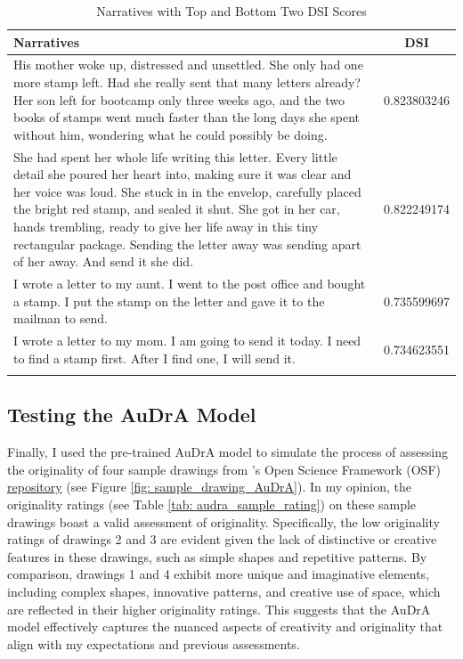 \documentclass[../Proposal_Writing_Sample.tex]{subfiles}
\begin{document}
\begin{longtable}{|p{13cm}|c|}
    \hline
    Narratives & DSI \\ 
    \hline
    His mother woke up, distressed and unsettled. She only had one more stamp left. Had she really sent that many letters already? Her son left for bootcamp only three weeks ago, and the two books of stamps went much faster than the long days she spent without him, wondering what he could possibly be doing. & 0.823803246 \\ 
    \hline
    She had spent her whole life writing this letter. Every little detail she poured her heart into, making sure it was clear and her voice was loud. She stuck in in the envelop, carefully placed the bright red stamp, and sealed it shut. She got in her car, hands trembling, ready to give her life away in this tiny rectangular package. Sending the letter away was sending apart of her away. And send it she did. & 0.822249174 \\
    \hline
    I wrote a letter to my aunt. I went to the post office and bought a stamp. I put the stamp on the letter and gave it to the mailman to send. & 0.735599697 \\
    \hline
    I wrote a letter to my mom. I am going to send it today. I need to find a stamp first. After I find one, I will send it. & 0.734623551 \\
    \hline
    \caption{Narratives with Top and Bottom Two DSI Scores}
    \label{tab: narratives with top and bottom 2 DSI scores}
\end{longtable}

\subsection*{Testing the AuDrA Model}
Finally, I used the pre-trained AuDrA model to simulate the process of assessing the originality of four sample drawings from \textcite{patterson_audra_2023}'s Open Science Framework (OSF) \href{https://osf.io/kqn9v/}{repository} (see Figure \ref{fig: sample_drawing_AuDrA}). In my opinion, the originality ratings (see Table \ref{tab: audra_sample_rating}) on these sample drawings boast a valid assessment of originality. Specifically, the low originality ratings of drawings 2 and 3 are evident given the lack of distinctive or creative features in these drawings, such as simple shapes and repetitive patterns. By comparison, drawings 1 and 4 exhibit more unique and imaginative elements, including complex shapes, innovative patterns, and creative use of space, which are reflected in their higher originality ratings. This suggests that the AuDrA model effectively captures the nuanced aspects of creativity and originality that align with my expectations and previous assessments.
\end{document}
